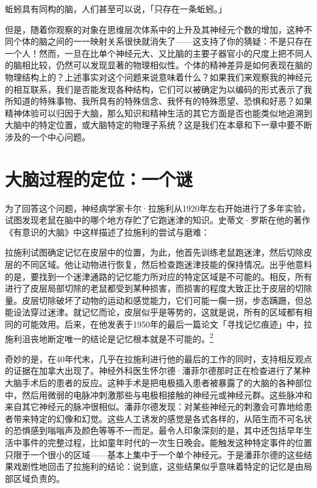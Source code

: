 \documentclass[
  12pt,
  twoside,
  openright,
  oldfontcommands,
]{memoir}
\newenvironment{fsquote}{%
  \begin{mdframed}[style=gebquote]\kaitifamily\small%
}{%
  \end{mdframed}%
}
\begin{document}
蚯蚓具有同构的脑，人们甚至可以说，「只存在一条蚯蚓。」

但是，随着你观察的对象在思维层次体系中的上升及其神经元个数的增加，这种不同个体的脑之间的一一映射关系很快就消失了------这支持了你的猜疑：不是只存在一个人！然而，一旦在比单个神经元大、又比脑的主要子器官小的尺度上把不同人的脑相比较，仍然可以发现显著的物理相似性。个体的精神差异是如何表现在脑的物理结构上的？上述事实对这个问题来说意味着什么？如果我们来观察我的神经元的相互联系，我们是否能发现各种结构，它们可以被确定为以编码的形式表示了我所知道的特殊事物、我所具有的特殊信念、我怀有的特殊愿望、恐惧和好恶？如果精神体验可以归因于大脑，那么知识和精神生活的其它方面是否也能类似地追溯到大脑中的特定位置，或大脑特定的物理子系统？这是我们在本章和下一章中要不断涉及的一个中心问题。

\section{大脑过程的定位：一个谜}

为了回答这个问题，神经病学家卡尔·拉施利从1920年左右开始进行了多年实验，试图发现老鼠在脑中的哪个地方存贮了它跑迷津的知识。史蒂文·罗斯在他的著作《有意识的大脑》中这样描述了拉施利的尝试与磨难：

\begin{fsquote}
拉施利试图确定记忆在皮层中的位置，为此，他首先训练老鼠跑迷津，然后切除皮层的不同区域。他让动物进行恢复，然后检查跑迷津技能的保持情况。出乎他意料的是，要找到一个迷津通路的记忆能力所对应的特定区域是不可能的。相反，所有进行了皮层局部切除的老鼠都受到某种损害，而损害的程度大致正比于皮层的切除量。皮层切除破坏了动物的运动和感觉能力，它们可能一瘸一拐，步态蹒跚，但总能设法穿过迷津。就记忆而论，皮层似乎是等势的，这就是说，所有的区域都有相同的可能效用。后来，在他发表于1950年的最后一篇论文「寻找记忆痕迹」中，拉施利沮丧地断定唯一的结论是记忆根本就是不可能的。\hyperref[fn:Chapter11-2]{\textsuperscript{2}}
\end{fsquote}

奇妙的是，在40年代末，几乎在拉施利进行他的最后的工作的同时，支持相反观点的证据在加拿大出现了。神经外科医生怀尔德·潘菲尔德那时正在检查进行了某种大脑手术后的患者的反应。这种手术是把电极插入患者被暴露了的大脑的各种部位中，然后用微弱的电脉冲刺激那些与电极相接触的神经元或神经元群。这些脉冲和来自其它神经元的脉冲很相似。潘菲尔德发现：对某些神经元的刺激会可靠地给患者带来特定的幻像和幻觉。这些人工诱发的感觉是各式各样的，从陌生而不可名状的恐惧感到嗡嗡声及颜色等等不一而足。最令人印象深刻的是，其中还包括早年生活中事件的完整过程，比如童年时代的一次生日晚会。能触发这种特定事件的位置只限于一个很小的区域------基本上集中于一个单个神经元。于是潘菲尔德的这些结果戏剧性地回击了拉施利的结论：说到底，这些结果似乎意味着特定的记忆是由局部区域负责的。
\end{document}
